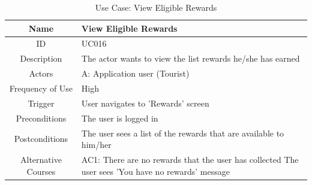 \documentclass[12pt, a4paper, oneside]{article}
\begin{document}
\begin{table}[H]
\begin{tabularx}{\linewidth}{|c|X|}
\hline
Name                & View Eligible Rewards                                                                                                                                                                                                                      \\ \hline
ID                  & UC016                                                                                                                                                                                                                       \\ \hline
Description         & The actor wants to view the list rewards he/she has earned                                                                                                                                                 \\ \hline
Actors              & A: Application user (Tourist)                                                                                                                                                                                                 \\ \hline
Frequency of Use    & High                                                                                                                                                                                                                    \\ \hline
Trigger             & User navigates to 'Rewards' screen                                                                                                                                                                                           \\ \hline
Preconditions       & The user is logged in                                                                                                                                                                                                                          \\ \hline
Postconditions      & The user sees a list of the rewards that are available to him/her                                                                                                                                      \\ \hline
Alternative Courses & AC1: There are no rewards that the user has collected \newline The user sees 'You have no rewards' message                                                                                           \\ \hline
\end{tabularx}
\caption{Use Case: View Eligible Rewards}
\label{uc-view-rewards}
\end{table}
\end{document}
